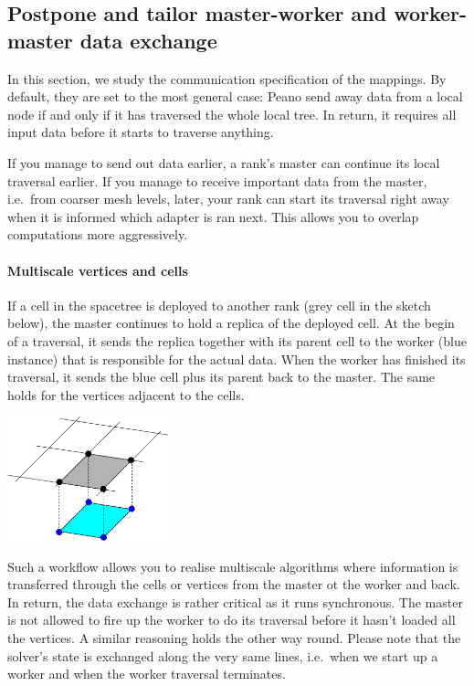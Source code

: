 \subsection{Postpone and tailor master-worker and worker-master data exchange}

In this section, we study the communication specification of the mappings. 
By default, they are set to the most general case:
Peano send away data from a local node if and only if it has traversed the whole local tree. 
In return, it requires all input data before it starts to traverse anything.

If you manage to send out data earlier, a rank's master can continue its local
traversal earlier.
If you manage to receive important data from the master, i.e.~from coarser
mesh levels, later, your rank can start its traversal right away when it is
informed which adapter is ran next.
This allows you to overlap computations more aggressively. 


\paragraph{Multiscale vertices and cells}

If a cell in the spacetree is deployed to another rank (grey cell in the sketch
below), the master continues to hold a replica of the deployed cell.
At the begin of a traversal, it sends the replica together with its parent cell
to the worker (blue instance) that is responsible for the actual data.
When the worker has finished its traversal, it sends the blue cell plus its
parent back to the master.
The same holds for the vertices adjacent to the cells.

\begin{center}
  \includegraphics[width=0.35\textwidth]{63_mpi-synchronisation/master-worker.pdf}
\end{center}

\noindent
Such a workflow allows you to realise multiscale algorithms where information is
transferred through the cells or vertices from the master ot the worker and
back.
In return, the data exchange is rather critical as it runs synchronous.
The master is not allowed to fire up the worker to do its traversal before it
hasn't loaded all the vertices.
A similar reasoning holds the other way round.
Please note that the solver's state is exchanged along the very same lines,
i.e.~when we start up a worker and when the worker traversal terminates.


